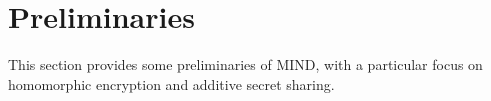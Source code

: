 ﻿\documentclass[conference]{IEEEtran}
\begin{document}

\section{Preliminaries}
This section provides some preliminaries of MIND, with a particular focus on homomorphic encryption and additive secret sharing.
\end{document}
